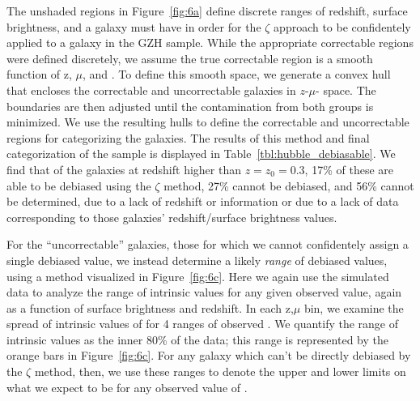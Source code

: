\documentclass[twocolumn]{aastex6}
\begin{document}
The unshaded regions in Figure~\ref{fig:6a} define discrete ranges of redshift, surface brightness, and \pfeatures{} a galaxy must have in order for the $\zeta$ approach to be confidentely applied to a galaxy in the GZH sample. While the appropriate correctable regions were defined discretely, we assume the true correctable region is a smooth function of z, $\mu$, and \pfeatures{}. To define this smooth space, we generate a convex hull that encloses the correctable and uncorrectable \ferengi{} galaxies in $z$-$\mu$-\pfeatures{} space. The boundaries are then adjusted until the contamination from both groups is minimized. We use the resulting hulls to define the correctable and uncorrectable regions for categorizing the \hst{} galaxies. The results of this method and final categorization of the \hst{} sample is displayed in Table~\ref{tbl:hubble_debiasable}. We find that of the galaxies at redshift higher than $z=z_{0}=0.3$, 17\% of these are able to be debiased using the $\zeta$ method, 27\% cannot be debiased, and 56\% cannot be determined, due to a lack of redshift or information or due to a lack of \ferengi{} data corresponding to those galaxies' redshift/surface brightness values.

For the ``uncorrectable'' galaxies, those for which we cannot confidentely assign a single debiased \pfeatures{} value, we instead determine a likely \emph{range} of debiased values, using a method visualized in Figure~\ref{fig:6c}. Here we again use the \ferengi{} simulated data to analyze the range of intrinsic \pfeaturesrest{} values for any given observed \pfeatures{} value, again as a function of surface brightness and redshift. In each z,$\mu$ bin, we examine the spread of intrinsic values of \pfeaturesrest{} for 4 ranges of observed \pfeatures. We quantify the range of intrinsic values as the inner 80\% of the data; this range is represented by the orange bars in Figure~\ref{fig:6c}. For any galaxy which can't be directly debiased by the $\zeta$ method, then, we use these ranges to denote the upper and lower limits on what we expect \pfeaturesrest{} to be for any observed value of \pfeatures. 
\end{document}

